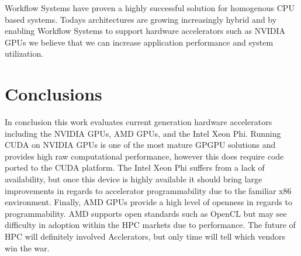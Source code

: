 \documentclass[conference]{IEEEtran}
\begin{document}
Workflow Systems have proven a highly successful solution for homogenous CPU based systems. Todays architectures are growing increasingly hybrid and by enabling Workflow Systems to support hardware accelerators such as NVIDIA GPUs we believe that we can increase application performance and system utilization.

\section{Conclusions}
In conclusion this work evaluates current generation hardware accelerators including the NVIDIA GPUs, AMD GPUs, and the Intel Xeon Phi. Running CUDA on NVIDIA GPUs is one of the most mature GPGPU solutions and provides high raw computational performance, however this does require code ported to the CUDA platform. The Intel Xeon Phi suffers from a lack of availability, but once this device is highly available it should bring large improvements in regards to accelerator programmability due to the familiar x86 environment. Finally, AMD GPUs provide a high level of openness in regards to programmability. AMD supports open standards such as OpenCL but may see difficulty in adoption within the HPC markets due to performance. The future of HPC will definitely involved Acclerators, but only time will tell which vendors win the war.



\end{document}
